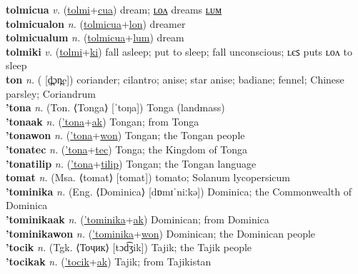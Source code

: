 \textbf{tolmicua} \textit{v.} (\hyperref[tolmi]{tolmi}+\hyperref[cua]{cua})
dream; \hyperref[tolmicualon]{ʟᴏᴧ} dreams \hyperref[tolmicualum]{ʟᴜᴍ} \label{tolmicua} \\
\textbf{tolmicualon} \textit{n.} (\hyperref[tolmicua]{tolmicua}+\hyperref[lon]{lon})
dreamer \label{tolmicualon} \\
\textbf{tolmicualum} \textit{n.} (\hyperref[tolmicua]{tolmicua}+\hyperref[lum]{lum})
dream \label{tolmicualum} \\
\textbf{tolmiki} \textit{v.} (\hyperref[tolmi]{tolmi}+\hyperref[ki]{ki})
fall asleep; put to sleep; fall unconscious; ʟєꜱ puts ʟᴏᴧ to sleep \label{tolmiki} \\
\textbf{ton} \textit{n.} ( [d̪̤ɔn̪e])
coriander; cilantro; anise; star anise; badiane; fennel; Chinese parsley; Coriandrum \label{ton} \\
\textbf{'tona} \textit{n.} (Ton. ⟨Tonga⟩ [ˈtoŋa])
Tonga (landmass) \label{'tona} \\
\textbf{'tonaak} \textit{n.} (\hyperref['tona]{'tona}+\hyperref[ak]{ak})
Tongan; from Tonga \label{'tonaak} \\
\textbf{'tonawon} \textit{n.} (\hyperref['tona]{'tona}+\hyperref[won]{won})
Tongan; the Tongan people \label{'tonawon} \\
\textbf{'tonatec} \textit{n.} (\hyperref['tona]{'tona}+\hyperref[tec]{tec})
Tonga; the Kingdom of Tonga \label{'tonatec} \\
\textbf{'tonatilip} \textit{n.} (\hyperref['tona]{'tona}+\hyperref[tilip]{tilip})
Tongan; the Tongan language \label{'tonatilip} \\
\textbf{tomat} \textit{n.} (Msa. ⟨tomat⟩ [tomat])
tomato; Solanum lycopersicum \label{tomat} \\
\textbf{'tominika} \textit{n.} (Eng. ⟨Dominica⟩ [dɒmɪˈniːkə])
Dominica; the Commonwealth of Dominica \label{'tominika} \\
\textbf{'tominikaak} \textit{n.} (\hyperref['tominika]{'tominika}+\hyperref[ak]{ak})
Dominican; from Dominica \label{'tominikaak} \\
\textbf{'tominikawon} \textit{n.} (\hyperref['tominika]{'tominika}+\hyperref[won]{won})
Dominican; the Dominican people \label{'tominikawon} \\
\textbf{'tocik} \textit{n.} (Tgk. ⟨Тоҷик⟩ [tɔd͡ʒik])
Tajik; the Tajik people \label{'tocik} \\
\textbf{'tocikak} \textit{n.} (\hyperref['tocik]{'tocik}+\hyperref[ak]{ak})
Tajik; from Tajikistan \label{'tocikak} \\
